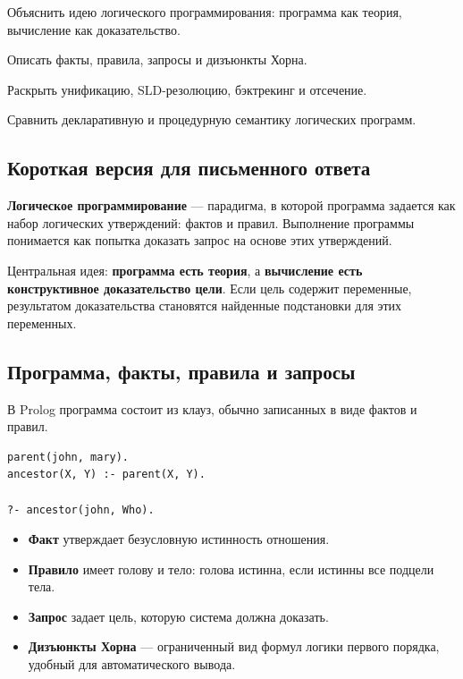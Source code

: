 
\begin{examplan}
    \item Объяснить идею логического программирования: программа как теория, вычисление как доказательство.
    \item Описать факты, правила, запросы и дизъюнкты Хорна.
    \item Раскрыть унификацию, SLD-резолюцию, бэктрекинг и отсечение.
    \item Сравнить декларативную и процедурную семантику логических программ.
\end{examplan}

\subsection*{Короткая версия для письменного ответа}

\textbf{Логическое программирование} --- парадигма, в которой программа задается как набор логических утверждений: фактов и правил. Выполнение программы понимается как попытка доказать запрос на основе этих утверждений.

Центральная идея: \textbf{программа есть теория}, а \textbf{вычисление есть конструктивное доказательство цели}. Если цель содержит переменные, результатом доказательства становятся найденные подстановки для этих переменных.

\subsection*{Программа, факты, правила и запросы}

В Prolog программа состоит из клауз, обычно записанных в виде фактов и правил.

\begin{verbatim}
parent(john, mary).
ancestor(X, Y) :- parent(X, Y).

?- ancestor(john, Who).
\end{verbatim}

\begin{itemize}
    \item \textbf{Факт} утверждает безусловную истинность отношения.
    \item \textbf{Правило} имеет голову и тело: голова истинна, если истинны все подцели тела.
    \item \textbf{Запрос} задает цель, которую система должна доказать.
    \item \textbf{Дизъюнкты Хорна} --- ограниченный вид формул логики первого порядка, удобный для автоматического вывода.
\end{itemize}

